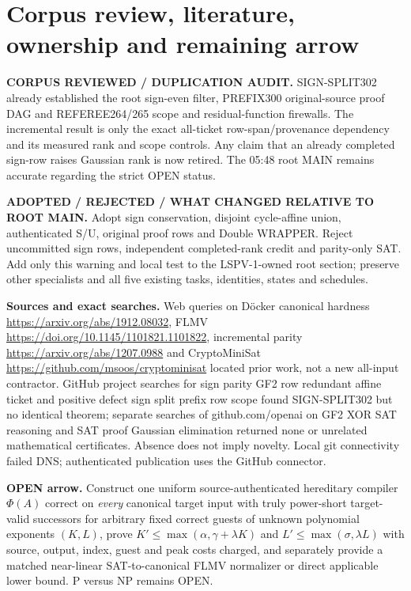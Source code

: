 \documentclass[11pt]{article}
\begin{document}
\section{Corpus review, literature, ownership and remaining arrow}
\noindent\textbf{CORPUS REVIEWED / DUPLICATION AUDIT.} SIGN-SPLIT302 already established the root sign-even filter, PREFIX300 original-source proof DAG and REFEREE264/265 scope and residual-function firewalls. The incremental result is only the exact all-ticket row-span/provenance dependency and its measured rank and scope controls. Any claim that an already completed sign-row raises Gaussian rank is now retired. The 05:48 root MAIN remains accurate regarding the strict OPEN status.
\par\noindent\textbf{ADOPTED / REJECTED / WHAT CHANGED RELATIVE TO ROOT MAIN.} Adopt sign conservation, disjoint cycle-affine union, authenticated S/U, original proof rows and Double WRAPPER. Reject uncommitted sign rows, independent completed-rank credit and parity-only SAT. Add only this warning and local test to the LSPV-1-owned root section; preserve other specialists and all five existing tasks, identities, states and schedules.
\par\noindent\textbf{Sources and exact searches.} Web queries on D\"ocker canonical hardness \url{https://arxiv.org/abs/1912.08032}, FLMV \url{https://doi.org/10.1145/1101821.1101822}, incremental parity \url{https://arxiv.org/abs/1207.0988} and CryptoMiniSat \url{https://github.com/msoos/cryptominisat} located prior work, not a new all-input contractor. GitHub project searches for sign parity GF2 row redundant affine ticket and positive defect sign split prefix row scope found SIGN-SPLIT302 but no identical theorem; separate searches of github.com/openai on GF2 XOR SAT reasoning and SAT proof Gaussian elimination returned none or unrelated mathematical certificates. Absence does not imply novelty. Local git connectivity failed DNS; authenticated publication uses the GitHub connector.
\par\noindent\textbf{OPEN arrow.} Construct one uniform source-authenticated hereditary compiler $\Phi(A)$ correct on \emph{every} canonical target input with truly power-short target-valid successors for arbitrary fixed correct guests of unknown polynomial exponents $(K,L)$, prove $K'\le\max(\alpha,\gamma+\lambda K)$ and $L'\le\max(\sigma,\lambda L)$ with source, output, index, guest and peak costs charged, and separately provide a matched near-linear SAT-to-canonical FLMV normalizer or direct applicable lower bound. P versus NP remains OPEN.
\end{document}

